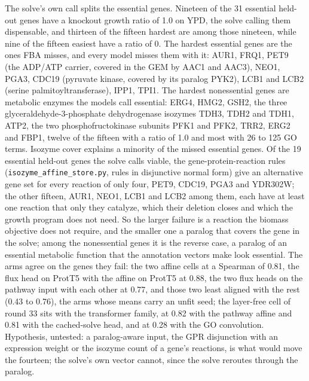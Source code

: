 

The solve's own call splits the essential genes. Nineteen of the 31 essential held-out
genes have a knockout growth ratio of 1.0 on YPD, the solve calling them dispensable,
and thirteen of the fifteen hardest are among those nineteen, while nine of the
fifteen easiest have a ratio of 0. The hardest essential genes are the ones FBA misses,
and every model misses them with it: AUR1, FRQ1, PET9 (the ADP/ATP carrier, covered in
the GEM by AAC1 and AAC3), NEO1, PGA3, CDC19 (pyruvate kinase, covered by its paralog
PYK2), LCB1 and LCB2 (serine palmitoyltransferase), IPP1, TPI1. The hardest
nonessential genes are metabolic enzymes the models call essential: ERG4, HMG2, GSH2,
the three glyceraldehyde-3-phosphate dehydrogenase isozymes TDH3, TDH2 and TDH1, ATP2,
the two phosphofructokinase subunits PFK1 and PFK2, TRR2, ERG2 and FBP1, twelve of the
fifteen with a ratio of 1.0 and most with 26 to 125 GO terms. Isozyme cover explains a
minority of the missed essential genes. Of the 19 essential held-out genes the solve
calls viable, the gene-protein-reaction rules (\texttt{isozyme\_affine\_store.py},
rules in disjunctive normal form) give an alternative gene set for every reaction of
only four, PET9, CDC19, PGA3 and YDR302W; the other fifteen, AUR1, NEO1, LCB1 and
LCB2 among them, each have at least one reaction that only they catalyze, which their
deletion closes and which the growth program does not need. So the larger failure is a
reaction the biomass objective does not require, and the smaller one a paralog that
covers the gene in the solve; among the nonessential genes it is the reverse case, a
paralog of an essential metabolic function that the annotation vectors make look
essential. The arms agree on the genes they fail: the two
affine cells at a Spearman of 0.81, the flux head on ProtT5 with the affine on ProtT5
at 0.88, the two flux heads on the pathway input with each other at 0.77, and those
two least aligned with the rest (0.43 to 0.76), the arms whose means carry an unfit
seed; the layer-free cell of round 33 sits with the transformer family, at 0.82 with
the pathway affine and 0.81 with the cached-solve head, and at 0.28 with the GO
convolution.
Hypothesis, untested: a paralog-aware input, the GPR disjunction with an expression
weight or the isozyme count of a gene's reactions, is what would move the fourteen; the
solve's own vector cannot, since the solve reroutes through the paralog.

